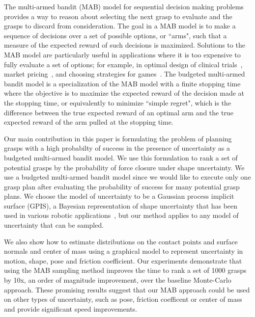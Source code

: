 \documentclass[letterpaper, 10 pt, conference]{ieeeconf}  %
\begin{document}
The multi-armed bandit (MAB) model for sequential decision making problems \cite{barto1998reinforcement, lai1985asymptotically, robbins1952some} provides a way to reason about selecting the next grasp to evaluate and the grasps to discard from consideration.
The goal in a MAB model is to make a sequence of decisions over a set of possible options, or ``arms", such that a measure of the expected reward of such decisions is maximized.
Solutions to the MAB model are particularly useful in applications where it is too expensive to fully evaluate a set of options; for example, in optimal design of clinical trials~\cite{simon1989optimal}, market pricing~\cite{rothschild1974two}, and choosing strategies for games~\cite{st2012online}.
The budgeted multi-armed bandit model \cite{madani2004budgeted} is a specialization of the MAB model with a finite stopping time where the objective is to maximize the expected reward of the decision made at the stopping time, or equivalently to minimize ``simple regret", which is the difference between the true expected reward of an optimal arm and the true expected reward of the arm pulled at the stopping time.

Our main contribution in this paper is formulating the problem of planning grasps with a high probabilty of success in the presence of uncertainty as a budgeted multi-armed bandit model.
We use this formulation to rank a set of potential grasps by the probability of force closure \cite{christopoulos2007handling, kehoe2012toward} under shape uncertainty.
We use a budgeted multi-armed bandit model since we would like to execute only one grasp plan after evaluating the probability of success for many potential grasp plans.
We choose the model of uncertainty to be a Gaussian process implicit surface (GPIS), a Bayesian representation of shape uncertainty that has been used in various robotic applications~\cite{dragiev2011, hollinger2013}, but our method applies to any model of uncertainty that can be sampled.

We also show how to estimate distributions on the contact points and surface normals and center of mass using a graphical model to represent uncertainty in motion, shape, pose and friction coefficient. Our experiments demonstrate that using the MAB sampling method improves the time to rank a set of 1000 grasps by 10x, an order of magnitude improvement, over the baseline Monte-Carlo approach. These promising results suggest that our MAB approach could be used on other types of uncertainty, such as pose, friction coefficent or center of mass and provide significant speed improvements. 
\end{document}
